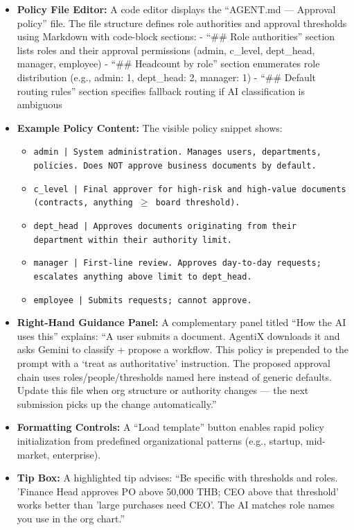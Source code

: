 \documentclass[12pt,oneside,openright,a4paper]{cpe-english-project}
\begin{document}
\begin{itemize}
\item \textbf{Policy File Editor:} A code editor displays the ``AGENT.md — Approval policy'' file. The file structure defines role authorities and approval thresholds using Markdown with code-block sections:
  - ``\#\# Role authorities'' section lists roles and their approval permissions (admin, c\_level, dept\_head, manager, employee)
  - ``\#\# Headcount by role'' section enumerates role distribution (e.g., admin: 1, dept\_head: 2, manager: 1)
  - ``\#\# Default routing rules'' section specifies fallback routing if AI classification is ambiguous

\item \textbf{Example Policy Content:} The visible policy snippet shows:
  \begin{itemize}
  \item \texttt{admin | System administration. Manages users, departments, policies. Does NOT approve business documents by default.}
  \item \texttt{c\_level | Final approver for high-risk and high-value documents (contracts, anything $\geq$ board threshold).}
  \item \texttt{dept\_head | Approves documents originating from their department within their authority limit.}
  \item \texttt{manager | First-line review. Approves day-to-day requests; escalates anything above limit to dept\_head.}
  \item \texttt{employee | Submits requests; cannot approve.}
  \end{itemize}

\item \textbf{Right-Hand Guidance Panel:} A complementary panel titled ``How the AI uses this'' explains:
  ``A user submits a document. AgentiX downloads it and asks Gemini to classify + propose a workflow. This policy is prepended to the prompt with a `treat as authoritative' instruction. The proposed approval chain uses roles/people/thresholds named here instead of generic defaults. Update this file when org structure or authority changes — the next submission picks up the change automatically.''

\item \textbf{Formatting Controls:} A ``Load template'' button enables rapid policy initialization from predefined organizational patterns (e.g., startup, mid-market, enterprise).

\item \textbf{Tip Box:} A highlighted tip advises: ``Be specific with thresholds and roles. 'Finance Head approves PO above 50,000 THB; CEO above that threshold' works better than 'large purchases need CEO'. The AI matches role names you use in the org chart.''
\end{itemize}
\end{document}
